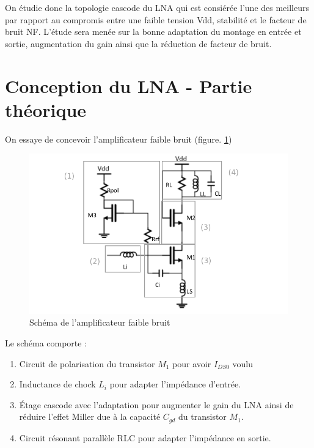 \documentclass[a4paper]{article}
\begin{document}
On \'etudie donc la topologie cascode du LNA qui est consi\'er\'ee l'une des meilleurs par rapport
au compromis entre une faible tension Vdd, stabilit\'e et le facteur de bruit NF. L'\'etude sera
men\'ee sur la bonne adaptation du montage en entr\'ee et sortie, augmentation du gain ainsi
que la r\'eduction de facteur de bruit.

\section{Conception du LNA - Partie th\'eorique}
On essaye de concevoir l'amplificateur faible bruit (figure. \ref{lna-ams})

\begin{figure}[!htb]
\begin{center}
  \includegraphics[scale=0.47]{lna-anotated.png}
  \caption{Sch\'ema de l'amplificateur faible bruit\cite{RFIC-tp-lna}}
  \label{lna-ams}
\end{center}
\end{figure}

Le sch\'ema comporte :
\begin{enumerate} \itemsep -3pt
  \item Circuit de polarisation du transistor $M_1$ pour avoir $I_{DS0}$ voulu
  \item Inductance de chock $L_i$ pour adapter l'imp\'edance d'entr\'ee.
  \item \'Etage cascode avec l'adaptation pour augmenter le gain du LNA ainsi de r\'eduire l'effet Miller due \`a la capacit\'e $C_{gd}$ du transistor $M_1$.
  \item Circuit r\'esonant parall\`ele RLC pour adapter l'imp\'edance en sortie.
\end{enumerate}
\end{document}
